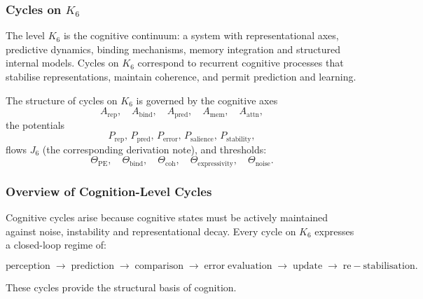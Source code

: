 
\subsubsection{Cycles on \texorpdfstring{$K_6$}{K_6}}
\label{sec:cycles-k6}

The level $K_6$ is the cognitive continuum: a system with representational
axes, predictive dynamics, binding mechanisms, memory integration and
structured internal models.  
Cycles on $K_6$ correspond to recurrent cognitive processes that stabilise
representations, maintain coherence, and permit prediction and learning.

The structure of cycles on $K_6$ is governed by the cognitive axes
\[
 A_{\mathrm{rep}},\quad
 A_{\mathrm{bind}},\quad
 A_{\mathrm{pred}},\quad
 A_{\mathrm{mem}},\quad
 A_{\mathrm{attn}},
\]
the potentials
\[
 P_{\mathrm{rep}},\, P_{\mathrm{pred}},\, P_{\mathrm{error}},\, 
 P_{\mathrm{salience}},\, P_{\mathrm{stability}},
\]
flows $J_6$ (the corresponding derivation note), and thresholds:
\[
 \Theta_{\mathrm{PE}},\quad
 \Theta_{\mathrm{bind}},\quad
 \Theta_{\mathrm{coh}},\quad
 \Theta_{\mathrm{expressivity}},\quad
 \Theta_{\mathrm{noise}}.
\]

\subsubsection{Overview of Cognition-Level Cycles}

Cognitive cycles arise because cognitive states must be actively maintained
against noise, instability and representational decay.  
Every cycle on $K_6$ expresses a closed-loop regime of:

\[
  \mathrm{perception}
  \;\to\;
  \mathrm{prediction}
  \;\to\;
  \mathrm{comparison}
  \;\to\;
  \mathrm{error\;evaluation}
  \;\to\;
  \mathrm{update}
  \;\to\;
  \mathrm{re-stabilisation}.
\]

These cycles provide the structural basis of cognition.

